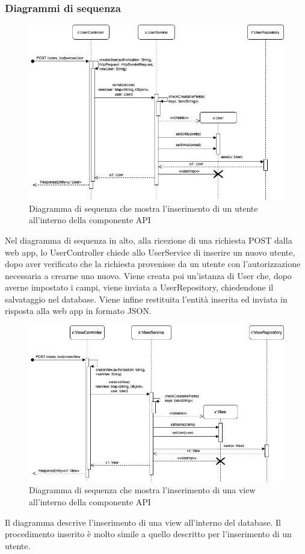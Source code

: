 \begin{landscape}
	\subsubsection{Diagrammi di sequenza}%
		\begin{figure}[H]
			\centering
			\includegraphics[scale=0.600]{res/images/API/inserimento_utente.png}
			\caption{Diagramma di sequenza che mostra l'inserimento di un utente all'interno della componente API}
			\label{Diagramma 17}
		\end{figure}
		Nel diagramma di sequenza in alto, alla ricezione di una richiesta POST dalla web app, lo UserController chiede allo UserService di inserire un nuovo utente, dopo aver verificato che la richiesta provenisse da un utente con l'autorizzazione necessaria a crearne uno nuovo.
		\newline
		Viene creata poi un'istanza di User che, dopo averne impostato i campi, viene inviata a UserRepository, chiedendone il salvataggio nel database. Viene infine restituita l'entità inserita ed inviata in risposta alla web app in formato JSON.
		\begin{figure}[H]
			\centering
			\includegraphics[scale=0.600]{res/images/API/inserimento_view.png}
			\caption{Diagramma di sequenza che mostra l'inserimento di una view all'interno della componente API}
			\label{Diagramma 18}
		\end{figure}
		Il diagramma descrive l'inserimento di una view all'interno del database. Il procedimento inserito è molto simile a quello descritto per l'inserimento di un utente.
	\end{landscape}
	

